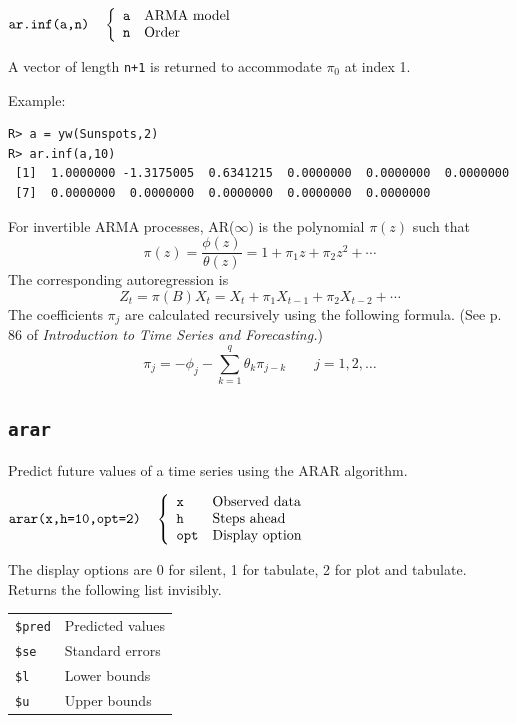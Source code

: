 \documentclass[12pt]{article}
\begin{document}
\bigskip
$
\hbox{\tt ar.inf(a,n)}\quad\left\{\begin{array}{ll}
{\tt a} & \hbox{ARMA model}\\
{\tt n} & \hbox{Order}
\end{array}\right.
$

\bigskip
\noindent
A vector of length {\tt n+1} is returned to accommodate $\pi_0$ at index 1.

\bigskip
\noindent
Example:

\begin{verbatim}
R> a = yw(Sunspots,2)
R> ar.inf(a,10)
 [1]  1.0000000 -1.3175005  0.6341215  0.0000000  0.0000000  0.0000000
 [7]  0.0000000  0.0000000  0.0000000  0.0000000  0.0000000
\end{verbatim}

\bigskip
\noindent
For invertible ARMA processes,
AR($\infty$) is the polynomial $\pi(z)$ such that
\[
\pi(z)=\frac{\phi(z)}{\theta(z)}=1+\pi_1z+\pi_2z^2+\cdots
\]
The corresponding autoregression is
\[
Z_t=\pi(B)X_t=X_t+\pi_1X_{t-1}+\pi_2X_{t-2}+\cdots
\]
The coefficients $\pi_j$ are calculated recursively using the following formula.
(See p. 86 of {\it Introduction to Time Series and Forecasting.})
\[
\pi_j=-\phi_j-\sum_{k=1}^q\theta_k\pi_{j-k}\qquad j=1,2,\ldots
\]

\newpage

\subsection{\tt arar}
Predict future values of a time series using the ARAR algorithm.

\bigskip
$
\hbox{\tt arar(x,h=10,opt=2)}\quad\left\{\begin{array}{ll}
{\tt x} & \hbox{Observed data}\\
{\tt h} & \hbox{Steps ahead}\\
{\tt opt} & \hbox{Display option}
\end{array}\right.
$

\bigskip
\noindent
The display options are 0 for silent, 1 for tabulate, 2 for plot and tabulate.
Returns the following list invisibly.

\begin{center}
\begin{tabular}{ll}
{\tt\$pred} & Predicted values\\
{\tt\$se} & Standard errors\\
{\tt\$l} & Lower bounds\\
{\tt\$u} & Upper bounds
\end{tabular}
\end{center}
\end{document}
